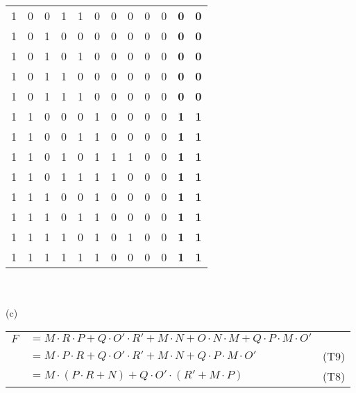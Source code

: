 \begin{tabular}{ccccc|ccccc|cc}
   1  &  0  &  0  &  1  &  1  &  0  &  0  &  0  &  0  &  0  & \textbf{ 0 } & \textbf{ 0 }\\
   1  &  0  &  1  &  0  &  0  &  0  &  0  &  0  &  0  &  0  & \textbf{ 0 } & \textbf{ 0 }\\
   1  &  0  &  1  &  0  &  1  &  0  &  0  &  0  &  0  &  0  & \textbf{ 0 } & \textbf{ 0 }\\
   1  &  0  &  1  &  1  &  0  &  0  &  0  &  0  &  0  &  0  & \textbf{ 0 } & \textbf{ 0 }\\
   1  &  0  &  1  &  1  &  1  &  0  &  0  &  0  &  0  &  0  & \textbf{ 0 } & \textbf{ 0 }\\
   1  &  1  &  0  &  0  &  0  &  1  &  0  &  0  &  0  &  0  & \textbf{ 1 } & \textbf{ 1 }\\
   1  &  1  &  0  &  0  &  1  &  1  &  0  &  0  &  0  &  0  & \textbf{ 1 } & \textbf{ 1 }\\
   1  &  1  &  0  &  1  &  0  &  1  &  1  &  1  &  0  &  0  & \textbf{ 1 } & \textbf{ 1 }\\
   1  &  1  &  0  &  1  &  1  &  1  &  1  &  0  &  0  &  0  & \textbf{ 1 } & \textbf{ 1 }\\
   1  &  1  &  1  &  0  &  0  &  1  &  0  &  0  &  0  &  0  & \textbf{ 1 } & \textbf{ 1 }\\
   1  &  1  &  1  &  0  &  1  &  1  &  0  &  0  &  0  &  0  & \textbf{ 1 } & \textbf{ 1 }\\
   1  &  1  &  1  &  1  &  0  &  1  &  0  &  1  &  0  &  0  & \textbf{ 1 } & \textbf{ 1 }\\
   1  &  1  &  1  &  1  &  1  &  1  &  0  &  0  &  0  &  0  & \textbf{ 1 } & \textbf{ 1 }\\
\end{tabular}\\ \\
(c)\\
\begin{tabular}{rll}
  $F$ & $=M \cdot R \cdot P + Q \cdot O' \cdot R' + M \cdot N + O \cdot N \cdot M + Q \cdot P \cdot M \cdot O'$ &\\
      & $=M \cdot P \cdot R + Q \cdot O' \cdot R' + M \cdot N + Q \cdot P \cdot M \cdot O'$ & (T9)\\
      & $=M \cdot (P \cdot R + N) + Q \cdot O' \cdot (R' + M \cdot P)$ & (T8)\\
\end{tabular}\\ \\
